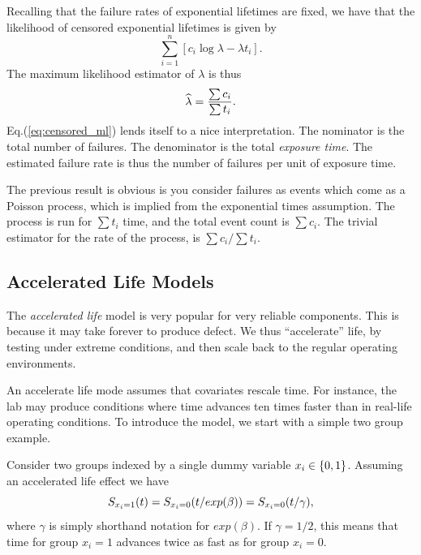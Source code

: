 \begin{example}
Recalling that the failure rates of exponential lifetimes are fixed, we have that the likelihood of censored exponential lifetimes is given by 
$$
	\sum_{i=1}^{n} [c_i \log \lambda - \lambda t_i].
$$
The maximum likelihood estimator of $\lambda$ is thus
\begin{align}
	\widehat{\lambda}= \frac{\sum c_i}{\sum t_i}. \label{eq:censored_ml}
\end{align}
Eq.(\ref{eq:censored_ml}) lends itself to a nice interpretation.
The nominator is the total number of failures.
The denominator is the total \emph{exposure time}. 
The estimated failure rate is thus the number of failures per unit of exposure time. 
\end{example}




\begin{extra}
The previous result is obvious is you consider failures as events which come as a Poisson process, which is implied from the exponential times assumption. 
The process is run for $\sum t_i$ time, and the total event count is $\sum c_i$. 
The trivial estimator for the rate of the process, is $\sum c_i/\sum t_i$.
\end{extra}






\subsection{Accelerated Life Models}
The \emph{accelerated life} model is very popular for very reliable components. This is because it may take forever to produce defect. We thus ``accelerate'' life, by testing under extreme conditions, and then scale back to the regular operating environments.

An accelerate life mode assumes that covariates rescale time. 
For instance, the lab may produce conditions where time advances ten times faster than in real-life operating conditions.
To introduce the model, we start with a simple two group example.
\begin{example}
Consider two groups indexed by a single dummy variable $x_i \in \{ 0,1 \}$.
Assuming an accelerated life effect we have
$$
	S_{x_i=1} (t)=S_{x_i=0} (t/exp(\beta))=S_{x_i=0} (t/\gamma), 
$$
where $\gamma$ is simply shorthand notation for $exp(\beta)$. 
If $\gamma=1/2$, this means that time for group $x_i=1$ advances twice as fast as for group $x_i=0$.
\end{example}

